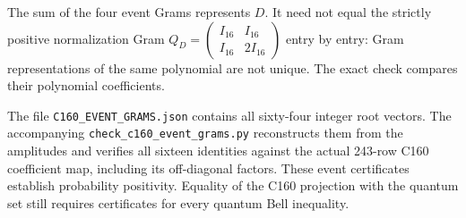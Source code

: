 \documentclass[11pt]{article}
\begin{document}
The sum of the four event Grams represents $D$. It need not equal
the strictly positive normalization Gram
$Q_D=\left(\begin{smallmatrix}I_{16}&I_{16}\\I_{16}&2I_{16}\end{smallmatrix}\right)$
entry by entry: Gram representations of the same polynomial are
not unique. The exact check compares their polynomial coefficients.

The file \nolinkurl{C160_EVENT_GRAMS.json} contains all sixty-four
integer root vectors. The accompanying
\nolinkurl{check_c160_event_grams.py} reconstructs them from the
amplitudes and verifies all sixteen identities against the actual
243-row C160 coefficient map, including its off-diagonal factors.
These event certificates establish probability positivity. Equality
of the C160 projection with the quantum set still requires certificates
for every quantum Bell inequality.
\end{document}
